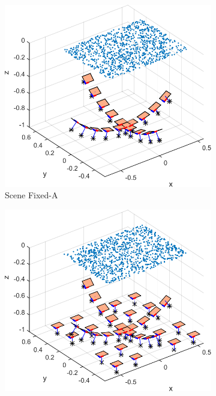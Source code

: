 \documentclass[10pt,twocolumn,letterpaper]{article}
\begin{document}
\begin{figure}
\centering
\begin{subfigure}[b]{0.32\linewidth}
	\includegraphics[width=\linewidth]{images/synthCameraPosesRotation.pdf}
	\caption{Scene Fixed-A}
\end{subfigure}
\begin{subfigure}[b]{0.32\linewidth}
	\includegraphics[width=\linewidth]{images/synthCameraPosesTranslation.pdf}

\end{subfigure}
\end{figure}
\end{document}
